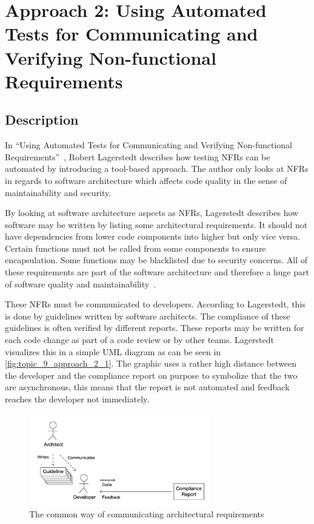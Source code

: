 \newpage

\section{Approach 2: Using Automated Tests for Communicating and Verifying Non-functional Requirements} \label{sec:9_approach_2}

\subsection{Description}

In \enquote{Using Automated Tests for Communicating and Verifying Non-functional Requirements}~\cite{Lagerstedt2014}, Robert Lagerstedt describes how testing NFRs can be automated by introducing a tool-based approach.
The author only looks at NFRs in regards to software architecture which affects code quality in the sense of maintainability and security.

By looking at software architecture aspects as NFRs, Lagerstedt describes how software may be written by listing some architectural requirements.
It should not have dependencies from lower code components into higher but only vice versa.
Certain functions must not be called from some components to ensure encapsulation. Some functions may be blacklisted due to security concerns.
All of these requirements are part of the software architecture and therefore a huge part of software quality and maintainability~\cite{Lagerstedt2014}.

These NFRs must be communicated to developers. According to Lagerstedt, this is done by guidelines written by software architects.
The compliance of these guidelines is often verified by different reports. These reports may be written for each code change as part of a code review or by other teams.
Lagerstedt visualizes this in a simple UML diagram as can be seen in
\autoref{fig:topic_9_approach_2_1}.
The graphic uses a rather high distance between the developer and the compliance report on purpose to symbolize that the two are asynchronous, this means that the report is not automated and feedback reaches the developer not immediately.

\begin{figure}[htbp]
	\centering
	\includegraphics[width=0.7\textwidth]{../images/topic_9_approach_2_1.png}
	\caption{The common way of communicating architectural requirements~\cite{Lagerstedt2014}}
	\label{fig:topic_9_approach_2_1}
\end{figure}

